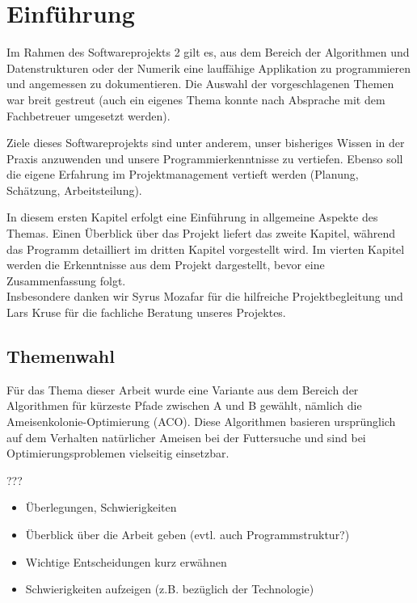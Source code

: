 




\chapter{Einführung}

Im Rahmen des Softwareprojekts 2 gilt es, aus dem Bereich der Algorithmen und Datenstrukturen oder der Numerik eine lauffähige Applikation zu programmieren und angemessen zu dokumentieren. Die Auswahl der vorgeschlagenen Themen war breit gestreut (auch ein eigenes Thema konnte nach Absprache mit dem Fachbetreuer umgesetzt werden).

Ziele dieses Softwareprojekts sind unter anderem, unser bisheriges Wissen in der Praxis anzuwenden und unsere Programmierkenntnisse zu vertiefen. Ebenso soll die eigene Erfahrung im   Projektmanagement vertieft werden (Planung, Schätzung, Arbeitsteilung).

In diesem ersten Kapitel erfolgt eine Einführung in allgemeine Aspekte des Themas. Einen Überblick über das Projekt liefert das zweite Kapitel, während das Programm detailliert im dritten Kapitel vorgestellt wird. Im vierten Kapitel werden die Erkenntnisse aus dem Projekt dargestellt, bevor eine Zusammenfassung folgt. \\

\noindent
Insbesondere danken wir Syrus Mozafar für die hilfreiche Projektbegleitung und Lars Kruse für die fachliche Beratung unseres Projektes.



\section{Themenwahl}

Für das Thema dieser Arbeit wurde eine Variante aus dem Bereich der Algorithmen für kürzeste Pfade zwischen A und B gewählt, nämlich die Ameisenkolonie-Optimierung (ACO). Diese Algorithmen basieren ursprünglich auf dem Verhalten natürlicher Ameisen bei der Futtersuche und sind bei Optimierungsproblemen vielseitig einsetzbar.


???
\begin{itemize}[noitemsep]
\item Überlegungen, Schwierigkeiten
\item Überblick über die Arbeit geben (evtl. auch Programmstruktur?)
\item Wichtige Entscheidungen kurz erwähnen
\item Schwierigkeiten aufzeigen (z.B. bezüglich der Technologie)
\end{itemize}



